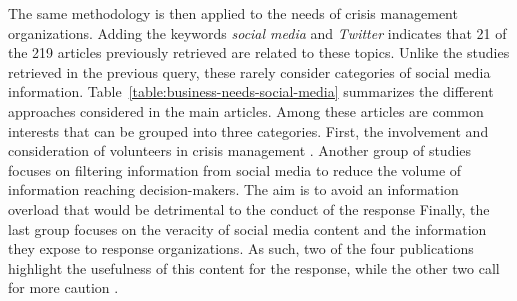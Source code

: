 The same methodology is then applied to the needs of crisis management organizations.
Adding the keywords \emph{social media} and \emph{Twitter} indicates that 21 of the 219 articles previously retrieved are related to these topics.
Unlike the studies retrieved in the previous query, these rarely consider categories of social media information.
Table~\ref{table:business-needs-social-media} summarizes the different approaches considered in the main articles.
Among these articles are common interests that can be grouped into three categories.
First, the involvement and consideration of volunteers in crisis management \parencite{smithSocialMediaCitizenled2018,graceCommunityCoordinationAligning2018,nielsenEmbracingIntegratingSpontaneous2019,cobbDesigningDelugeUnderstanding2014}.
Another group of studies focuses on filtering information from social media to reduce the volume of information reaching decision-makers.
The aim is to avoid an information overload that would be detrimental to the conduct of the response \parencite{onealTrainingEmergencyresponseImage2019,norri-sederholmEnsuringInformationFlow2017,moiStrategyProcessingAnalyzing2016,kaufholdMitigatingInformationOverload2020}
Finally, the last group focuses on the veracity of social media content and the information they expose to response organizations.
As such, two of the four publications highlight the usefulness of this content for the response, while the other two call for more caution \parencite{mehtaTrustVerifySocial2017,tapiaTrustworthyTweetDeeper2013,tapiaGoodEnoughGood2014,vangorpJustKeepTweeting2015}.

